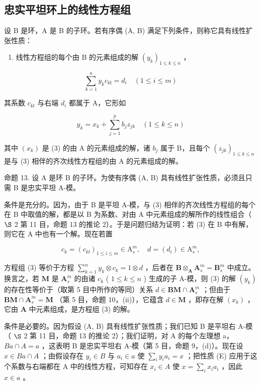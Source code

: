 \subsection{忠实平坦环上的线性方程组}

设 B 是环，A 是 B 的子环。若有序偶 (A, B) 满足下列条件，则称它具有线性扩张性质：

\begin{enumerate}
\def\labelenumi{(\Alph{enumi})}
\setcounter{enumi}{4}
\tightlist
\item
  线性方程组的每个由 B 的元素组成的解 \((y_{k})_{1\leqslant k\leqslant n}\) ，
\end{enumerate}

\[
\sum_ {k = 1} ^ {n} y _ {k} c _ {k \mathrm{l}} = d _ {i} \quad (1 \leqslant i \leqslant m)\tag{3}
\]

其系数 \(c_{kl}\) 与右端 \(d_{i}\) 都属于 A，它形如

\[
y _ {k} = x _ {k} + \sum_ {j = 1} ^ {p} b _ {j} z _ {j k} \quad (1 \leqslant k \leqslant n)\tag{4}
\]

其中 \((x_{k})\) 是 (3) 的由 A 的元素组成的解，诸 \(b_{j}\) 属于 B，且每个 \((z_{jk})_{1\leq k\leq n}\) 是与 (3) 相伴的齐次线性方程组的由 A 的元素组成的解。

命题 13. 设 A 是环 B 的子环。为使有序偶 (A, B) 具有线性扩张性质，必须且只需 B 是忠实平坦 A-模。

条件是充分的。因为，由于 B 是平坦 A-模，与 (3) 相伴的齐次线性方程组的每个在 B 中取值的解，都是以 B 为系数、对由 A 中元素组成的解所作的线性组合（ \(\S\) 2 第 11 目，命题 13 的推论 2）。于是问题归结为证明：若 (3) 在 B 中有解，则它在 A 中也有一个解。现在若置

\[
c _ {k} = \left(c _ {k l}\right) _ {1 \leqslant i \leqslant m} \in \mathrm{A} _ {s} ^ {m}, \quad d = (d _ {i}) \in \mathrm{A} _ {s} ^ {m},
\]

方程组 (3) 等价于方程 \(\sum_{k=1}^{n} y_k \otimes c_k = 1 \otimes d\) ，后者在 \(\mathbf{B} \otimes_{\mathbf{A}} \mathbf{A}_s^m = \mathbf{B}_s^m\) 中成立。换言之，若 \(\mathbf{M}\) 是 \(\mathbf{A}_s^m\) 的由诸 \(c_k\) ( \(1 \leqslant k \leqslant n\) ) 生成的子 A-模，则 (3) 的解 \((y_k)\) 的存在性等价于（取第 5 目中所作的等同）关系 \(d \in \mathbf{BM} \cap \mathbf{A}_s^m\) ；但由于 \(\mathbf{BM} \cap \mathbf{A}_s^m = \mathbf{M}\) （第 5 目，命题 10，(ii)），它蕴含 \(d \in \mathbf{M}\) ，即存在解 \((x_k)\) ，它由 \(\mathbf{A}\) 中元素组成，是方程组 (3) 的解。

条件是必要的。因为假设 (A, B) 具有线性扩张性质；我们已知 B 是平坦右 A-模（ \(\S\) 2 第 11 目，命题 13 的推论 2）；我们证明，对 A 的每个左理想 a， \(Ba \cap A = a\) ，这表明 B 是忠实平坦右 A-模（第 5 目，命题 9，(d)）。现在设 \(x \in Ba \cap A\) ；由假设存在 \(y_i \in B\) 与 \(a_i \in a\) 使 \(\sum_{i} y_i a_i = x\) ；把性质 (E) 应用于这个系数与右端都在 A 中的线性方程，可知存在 \(x_i \in A\) 使 \(x = \sum_{i} x_i a_i\) ，因此 \(x \in a\) 。

